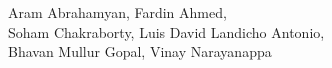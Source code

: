 

\begin{frame}
    \titlepage

    \begin{center}
        \small

    Aram Abrahamyan, Fardin Ahmed, \\ Soham Chakraborty, Luis David Landicho Antonio, \\ Bhavan Mullur Gopal,  Vinay Narayanappa
    \end{center}
\end{frame}
